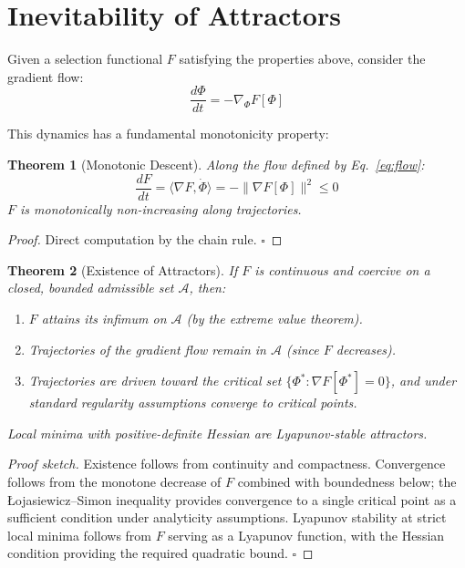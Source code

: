 \documentclass[12pt]{article}
\newtheorem{theorem}{Theorem}
\begin{document}
\section{Inevitability of Attractors}\label{sec:attractors}

Given a selection functional $F$ satisfying the properties above, consider the gradient flow:
\begin{equation}\label{eq:flow}
    \frac{d\Phi}{dt} = -\nabla_\Phi F[\Phi]
\end{equation}

This dynamics has a fundamental monotonicity property:

\begin{theorem}[Monotonic Descent]\label{thm:descent}
Along the flow defined by Eq.~\eqref{eq:flow}:
\begin{equation}
    \frac{dF}{dt} = \langle \nabla F, \dot{\Phi} \rangle = -\|\nabla F[\Phi]\|^2 \leq 0
\end{equation}
$F$ is monotonically non-increasing along trajectories.
\end{theorem}

\begin{proof}
Direct computation by the chain rule. $\square$
\end{proof}

\begin{theorem}[Existence of Attractors]\label{thm:attractors}
If $F$ is continuous and coercive on a closed, bounded admissible set $\mathcal{A}$, then:
\begin{enumerate}
    \item $F$ attains its infimum on $\mathcal{A}$ (by the extreme value theorem).
    \item Trajectories of the gradient flow remain in $\mathcal{A}$ (since $F$ decreases).
    \item Trajectories are driven toward the critical set $\{\Phi^* : \nabla F[\Phi^*] = 0\}$, and under standard regularity assumptions converge to critical points.
\end{enumerate}
Local minima with positive-definite Hessian are Lyapunov-stable attractors.
\end{theorem}

\begin{proof}[Proof sketch]
Existence follows from continuity and compactness. Convergence follows from the monotone decrease of $F$ combined with boundedness below; the \L{}ojasiewicz--Simon inequality provides convergence to a single critical point as a sufficient condition under analyticity assumptions. Lyapunov stability at strict local minima follows from $F$ serving as a Lyapunov function, with the Hessian condition providing the required quadratic bound. $\square$
\end{proof}
\end{document}
